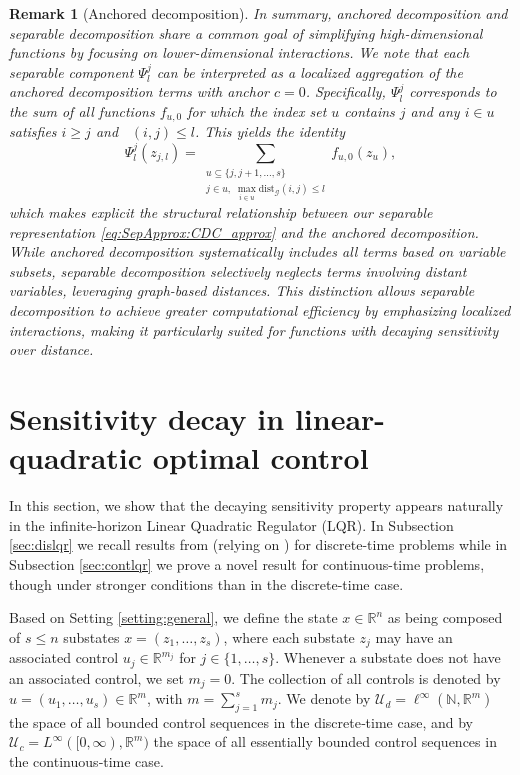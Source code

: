 \documentclass{article}
\def\N{\mathbb{N}}
\newcommand{\R}{\mathbb{R}}
\DeclareMathOperator{\distG}{\operatorname{dist_\mathcal{G}}} %
\newcommand{\agents}{\lbrace 1, \dots, s \rbrace}
\newtheorem{remark}{Remark}[section]
\begin{document}
\begin{remark}[Anchored decomposition]
In summary, anchored decomposition and separable decomposition share a common goal of simplifying high-dimensional functions by focusing on lower-dimensional interactions. 
We note that each separable component \(\Psi_l^j\) can be interpreted as a localized aggregation of the anchored decomposition terms with anchor $c = 0$. Specifically, \(\Psi_l^j\) corresponds to the sum of all functions \(f_{u,0}\) for which the index set \(u\) contains \(j\) and any $i \in u$ satisfies $i \geq j$ and $\distG(i,j) \leq l$. This yields the identity
\[
\Psi_l^j(z_{j,l})
=
\sum_{\substack{
  u\subseteq\{j,j+1,\dots,s\}\\
  j\in u,\;\max_{i\in u}\mathrm{dist}_{\mathcal{G}}(i,j)\le l
}}
f_{u,0}(z_u),
\]
which makes explicit the structural relationship between our separable representation \eqref{eq:SepApprox:CDC_approx} and the anchored decomposition. 
While anchored decomposition systematically includes all terms based on variable subsets, separable decomposition selectively neglects terms involving distant variables, leveraging graph-based distances. This distinction allows separable decomposition to achieve greater computational efficiency by emphasizing localized interactions, making it particularly suited for functions with decaying sensitivity over distance.
\end{remark}

\section{Sensitivity decay in linear-quadratic optimal control} \label{sec.ExistenceDecay}

In this section, we show that the decaying sensitivity property appears naturally in the infinite-horizon Linear Quadratic Regulator (LQR). In Subsection \ref{sec:dislqr} we recall results from \cite{sperl2023separable} (relying on \cite{shin2022lqr}) for discrete-time problems while in Subsection \ref{sec:contlqr} we prove a novel result for continuous-time problems, though under stronger conditions than in the discrete-time case.

Based on Setting \ref{setting:general}, we define the state $x \in \mathbb{R}^n$ as being composed of $s \leq n$ substates $x = (z_1, \dots, z_s)$, where each substate $z_j$ may have an associated control $u_j \in \mathbb{R}^{m_j}$ for $j \in \agents$. Whenever a substate does not have an associated control, we set $m_j = 0$. The collection of all controls is denoted by $u = (u_1, \dots, u_s) \in \mathbb{R}^m$, with $m = \sum_{j=1}^s m_j$. We denote by
$
  \mathcal U_d
  =
  \ell^\infty(\N,\R^m)
$
the space of all bounded control sequences in the discrete‐time case, and by
$
  \mathcal U_c
  =L^\infty([0,\infty),\R^m)
$
the space of all essentially bounded control sequences in the continuous‐time case.
\end{document}
